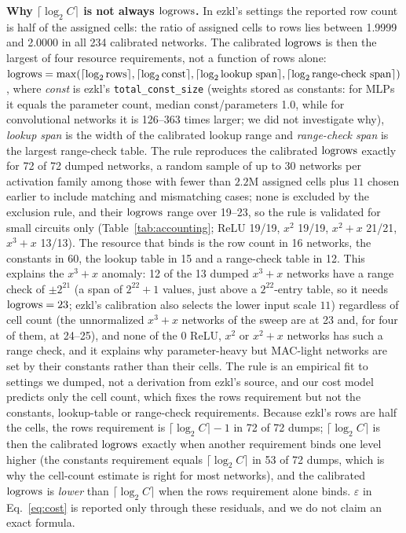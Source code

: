 \textbf{Why $\lceil\log_2 C\rceil$ is not always $\mathrm{logrows}$.}  In ezkl's settings the reported row count is half of the assigned cells: the ratio of assigned cells to rows lies between 1.9999 and 2.0000 in all 234 calibrated networks.  The calibrated $\mathrm{logrows}$ is then
the largest of four resource requirements, not a function of rows alone: $\mathrm{logrows}=\max(\lceil\log_2\text{rows}\rceil,\lceil\log_2\text{const}\rceil,\lceil\log_2\text{lookup span}\rceil,\lceil\log_2\text{range-check span}\rceil)$,
where \emph{const} is ezkl's \texttt{total\_const\_size} (weights stored as constants: for MLPs it equals the parameter count, median const/parameters 1.0, while for convolutional networks it is 126--363 times larger; we did not investigate why), \emph{lookup span} is the width of the calibrated lookup range and \emph{range-check span} is the largest range-check table.
The rule reproduces the calibrated $\mathrm{logrows}$ exactly for 72 of 72 dumped networks, a random sample of up to $30$ networks per activation family among those with fewer than $2.2$M assigned cells plus $11$ chosen earlier to include matching and mismatching cases; none is excluded by the exclusion rule, and their $\mathrm{logrows}$ range over 19--23, so the rule is validated for small circuits only (Table~\ref{tab:accounting}; ReLU 19/19, $x^2$ 19/19, $x^2{+}x$ 21/21, $x^3{+}x$ 13/13).
The resource that binds is the row count in 16 networks, the constants in 60, the lookup table in 15 and a range-check table in 12.  This explains the $x^3{+}x$ anomaly: 12 of the 13 dumped $x^3{+}x$ networks have a range check of
$\pm2^{21}$ (a span of $2^{22}+1$ values, just above a $2^{22}$-entry table, so it needs $\mathrm{logrows}=23$; ezkl's calibration also selects the lower input scale $11$) regardless of cell count (the unnormalized $x^3{+}x$ networks of the sweep are at 23 and, for four of them, at 24--25), and none of the 0 ReLU, $x^2$ or $x^2{+}x$ networks has such a range check, and it explains why parameter-heavy but MAC-light networks are set by their constants rather than their cells.  The rule is an empirical fit to settings we dumped, not a derivation from
ezkl's source, and our cost model predicts only the cell count, which fixes the rows requirement but not the constants, lookup-table or range-check requirements.  Because ezkl's rows are half the cells, the rows requirement is $\lceil\log_2 C\rceil-1$ in 72 of 72 dumps; $\lceil\log_2 C\rceil$ is then the calibrated $\mathrm{logrows}$ exactly when another requirement binds one level higher (the constants requirement equals $\lceil\log_2 C\rceil$ in 53 of 72 dumps, which is why the cell-count estimate is right for most networks), and the calibrated $\mathrm{logrows}$ is \emph{lower} than $\lceil\log_2 C\rceil$ when the rows requirement alone binds.  $\varepsilon$ in Eq.~\eqref{eq:cost} is reported
only through these residuals, and we do not claim an exact formula.





